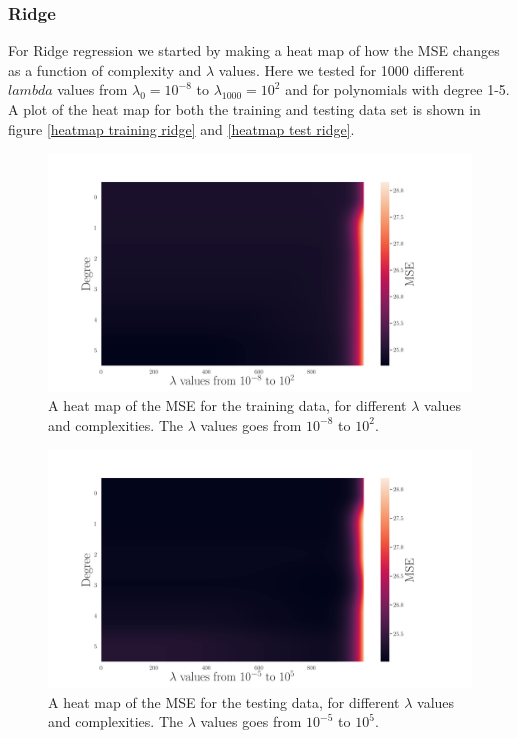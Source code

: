 \subsubsection{Ridge}
\noindent For Ridge regression we started by making a heat map of how the MSE changes as a function of complexity and $\lambda$ values. Here we tested for 1000 different $lambda$ values from $\lambda_0 = 10^{-8}$ to $\lambda_{1000} = 10^{2}$ and for polynomials with degree 1-5. A plot of the heat map for both the training and testing data set is shown in figure \eqref{heatmap training ridge} and \eqref{heatmap test ridge}.
\begin{figure}[h]
	\centering
	\includegraphics[width=\linewidth]{images/Figure_8.png}
	\caption{A heat map of the MSE for the training data, for different $\lambda$ values and complexities. The $\lambda$ values goes from $10^{-8}$ to $10^{2}$. }
	\label{heatmap training ridge}
\end{figure}
\begin{figure}[H]
	\centering
	\includegraphics[width=\linewidth]{images/Figure_7.png}
	\caption{A heat map of the MSE for the testing data, for different $\lambda$ values and complexities. The $\lambda$ values goes from $10^{-5}$ to $10^{5}$.}
	\label{heatmap test ridge}
\end{figure}
